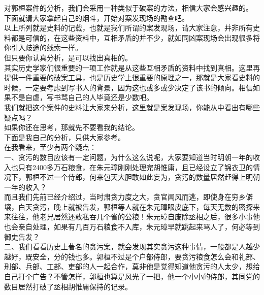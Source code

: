 \begin{multicols}{\theparacolNo}
对郭桓案件的分析，我们会采用一种类似于破案的方法，相信大家会感兴趣的。\\

下面就请大家拿起自己的烟斗，开始对案发现场的勘查吧。\\

以上所列就是史料的记载，也就是我们所谓的案发现场，请大家注意，并非所有史料都是可信的，在这些资料中，互相矛盾的并不少，就如同凶案现场会出现很多将你引入歧途的线索一样。\\

但只要你认真分析，是可以找出真相的。\\

其实历史学家们很重要的一项工作就是从这些互相矛盾的资料中找到真相。这里再提供一件重要的破案工具，也是历史学上很重要的原理之一，那就是大家看史料的时候，一定要考虑到写书人的背景，因为这也或多或少决定了该书的倾向。相信如果不是自虐，写书骂自己的人毕竟还是少数吧。\\

我们就把这个案件的史料让大家来分析，这里就是案发现场，你能从中看出有哪些疑点吗？\\

如果你还在思考，那就先不要看我的结论。\\

下面是我自己的分析，只供大家参考。\\

在我看来，至少有两个疑点：\\

一、贪污的数目应该有一定问题，为什么这么说呢，大家要知道当时明朝一年的收入也只有2400多万石粮食，在朱元璋刚刚处理完胡惟庸，且已经设立了锦衣卫的情况下，郭桓不过一个侍郎，何来包天大胆敢如此妄为，贪污的数量居然赶得上明朝一年的收入？\\

而且我们先前已经介绍过，当时肃贪力度之大，贪官闻风而逃，即使身在穷乡僻壤，白天贪污，晚上就被告发，郭桓等人就在朱元璋眼皮底下，每天无数的密探来来往往，他老兄居然还敢私吞几个省的公粮！朱元璋自废除丞相之后，很多小事他也会亲自处理，如果有几百万石粮食不入库，朱元璋早就跳起来骂人了，何必等到御史告发？\\

二、我们看看历史上著名的贪污案，就会发现其实贪污这种事情，一般都是人越少越好，既安全，分的钱也多。郭桓不过是个户部侍郎，要贪污粮食怎么会和礼部、刑部、兵部、工部、吏部的人一起合作，莫非他是觉得知道他贪污的人太少，想给自己打个广告？不管怎样，郭桓也算是风光了一把，他一个小小的侍郎，其同党的数目居然打破了丞相胡惟庸保持的记录。\\


\end{multicols}
